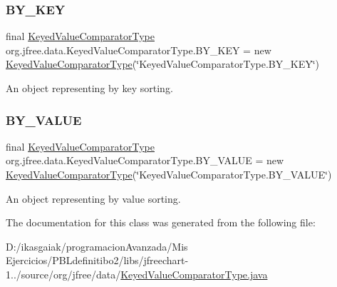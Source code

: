 \subsubsection{\texorpdfstring{B\+Y\+\_\+\+K\+EY}{BY\_KEY}}
{\footnotesize\ttfamily final \mbox{\hyperlink{classorg_1_1jfree_1_1data_1_1_keyed_value_comparator_type}{Keyed\+Value\+Comparator\+Type}} org.\+jfree.\+data.\+Keyed\+Value\+Comparator\+Type.\+B\+Y\+\_\+\+K\+EY = new \mbox{\hyperlink{classorg_1_1jfree_1_1data_1_1_keyed_value_comparator_type}{Keyed\+Value\+Comparator\+Type}}(\char`\"{}Keyed\+Value\+Comparator\+Type.\+B\+Y\+\_\+\+K\+EY\char`\"{})\hspace{0.3cm}{\ttfamily [static]}}

An object representing \textquotesingle{}by key\textquotesingle{} sorting. \mbox{\label{classorg_1_1jfree_1_1data_1_1_keyed_value_comparator_type_a84a661d687117e2a686bf23978745b81}} 
\subsubsection{\texorpdfstring{B\+Y\+\_\+\+V\+A\+L\+UE}{BY\_VALUE}}
{\footnotesize\ttfamily final \mbox{\hyperlink{classorg_1_1jfree_1_1data_1_1_keyed_value_comparator_type}{Keyed\+Value\+Comparator\+Type}} org.\+jfree.\+data.\+Keyed\+Value\+Comparator\+Type.\+B\+Y\+\_\+\+V\+A\+L\+UE = new \mbox{\hyperlink{classorg_1_1jfree_1_1data_1_1_keyed_value_comparator_type}{Keyed\+Value\+Comparator\+Type}}(\char`\"{}Keyed\+Value\+Comparator\+Type.\+B\+Y\+\_\+\+V\+A\+L\+UE\char`\"{})\hspace{0.3cm}{\ttfamily [static]}}

An object representing \textquotesingle{}by value\textquotesingle{} sorting. 

The documentation for this class was generated from the following file\+:\begin{DoxyCompactItemize}
\item 
D\+:/ikasgaiak/programacion\+Avanzada/\+Mis Ejercicios/\+P\+B\+Ldefinitibo2/libs/jfreechart-\/1../source/org/jfree/data/\mbox{\hyperlink{_keyed_value_comparator_type_8java}{Keyed\+Value\+Comparator\+Type.\+java}}\end{DoxyCompactItemize}
